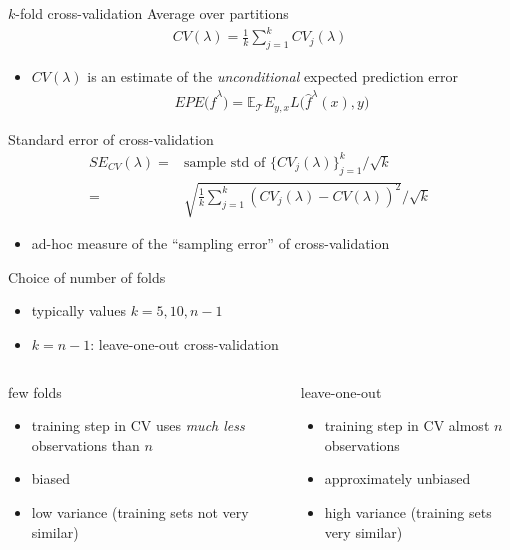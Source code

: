 \documentclass[xcolor=dvipsnames, handout]{beamer}
\newcommand{\E}{\mathbb{E}}
\begin{document}
\begin{frame}{$k$-fold cross-validation}
Average over partitions
\begin{align*}
  CV(\lambda) = \frac{1}{k} \sum_{j=1}^k CV_j(\lambda)
\end{align*}
\begin{itemize}
  \item $CV(\lambda)$ is an estimate of the \emph{unconditional} expected prediction error
    \begin{align*}
    EPE \big(\hat{f}^{\lambda}\big) = \E_{\mathcal{T}} E_{y, x} L \big(\hat{f}^{\lambda}(x), y \big)
  \end{align*}
\end{itemize}
\end{frame}

\begin{frame}{Standard error of cross-validation}
\begin{align*}
  SE_{CV}(\lambda) =& \text{sample std of $\{CV_j(\lambda)\}_{j=1}^k$}/{\sqrt{k}}
\\
  =& \sqrt{\frac{1}{k} \sum_{j=1}^k\left( CV_j(\lambda) - CV(\lambda)\right)^2}/\sqrt{k}
\end{align*}
\begin{itemize}
  \item ad-hoc measure of the ``sampling error'' of cross-validation
\end{itemize}
\end{frame}

\begin{frame}{Choice of number of folds}
\begin{itemize}
  \item typically values $k = 5, 10, n-1$
  \item $k = n-1$: leave-one-out cross-validation
\end{itemize}
\begin{columns}[t, onlytextwidth]
        \begin{block}{few folds}
        \begin{itemize}
          \item 
          training step in CV uses \emph{much less} observations than $n$
          \item 
          biased
          \item 
          low variance (training sets not very similar)
        \end{itemize}
        \end{block}
        \begin{block}{leave-one-out}
        \begin{itemize}
          \item 
          training step in CV almost $n$ observations
          \item 
          approximately unbiased
          \item 
          high variance (training sets very similar)        
        \end{itemize}
      \end{block}
\end{columns}
\end{frame}
\end{document}
